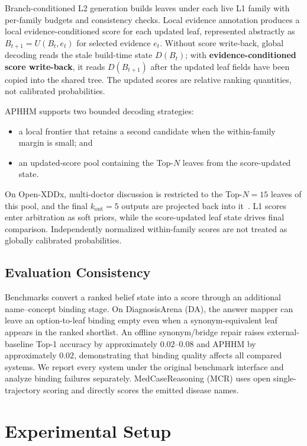\documentclass[letterpaper]{article} %
\begin{document}
Branch-conditioned L2 generation builds leaves under each live L1 family with per-family budgets and consistency checks.
Local evidence annotation produces a local evidence-conditioned score for each updated leaf, represented abstractly as $B_{t+1}=U(B_t,e_t)$ for selected evidence $e_t$.
Without score write-back, global decoding reads the stale build-time state $D(B_t)$; with \textbf{evidence-conditioned score write-back}, it reads $D(B_{t+1})$ after the updated leaf fields have been copied into the shared tree.
The updated scores are relative ranking quantities, not calibrated probabilities.

APHHM supports two bounded decoding strategies:
\begin{itemize}
  \item a local frontier that retains a second candidate when the within-family margin is small; and
  \item an updated-score pool containing the Top-$N$ leaves from the score-updated state.
\end{itemize}
On Open-XDDx, multi-doctor discussion is restricted to the Top-$N{=}15$ leaves of this pool, and the final $k_{\mathrm{out}}{=}5$ outputs are projected back into it~\cite{chen2025mac,mac2026}.
L1 scores enter arbitration as soft priors, while the score-updated leaf state drives final comparison.
Independently normalized within-family scores are not treated as globally calibrated probabilities.

\subsection{Evaluation Consistency}
\label{sec:protocol}

Benchmarks convert a ranked belief state into a score through an additional name--concept binding stage.
On DiagnosisArena (DA), the answer mapper can leave an option-to-leaf binding empty even when a synonym-equivalent leaf appears in the ranked shortlist.
An offline synonym/bridge repair raises external-baseline Top-1 accuracy by approximately $0.02$--$0.08$ and APHHM by approximately $0.02$, demonstrating that binding quality affects all compared systems.
We report every system under the original benchmark interface and analyze binding failures separately.
MedCaseReasoning (MCR) uses open single-trajectory scoring and directly scores the emitted disease names.

\section{Experimental Setup}
\label{sec:experiments}
\end{document}
